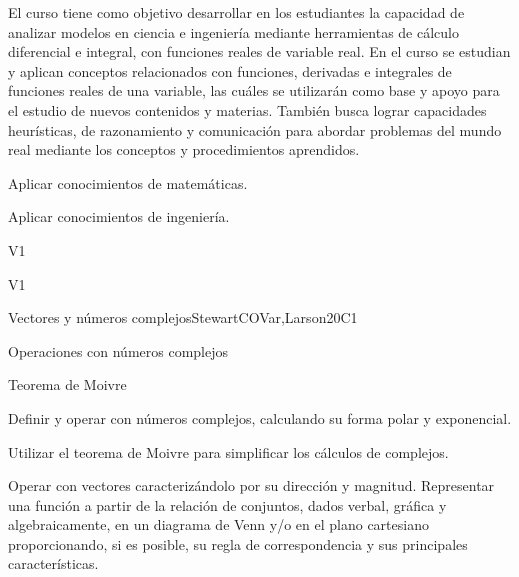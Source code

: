 \begin{syllabus}


\begin{justification}
El curso tiene como objetivo desarrollar en los estudiantes la capacidad de analizar modelos en ciencia e ingeniería mediante herramientas de cálculo
diferencial e integral, con funciones reales de variable real.
En el curso se estudian y aplican conceptos relacionados con funciones, derivadas e integrales de funciones reales de una variable, las cuáles se utilizarán como base y apoyo para el estudio de nuevos contenidos y materias.
También busca lograr capacidades heurísticas, de razonamiento y comunicación para abordar problemas del mundo real mediante los conceptos y procedimientos aprendidos.
\end{justification}

\begin{goals}
\item Aplicar conocimientos de matemáticas.
\item Aplicar conocimientos de ingeniería.
\end{goals}

\begin{outcomes}{V1}
   \item {}
   \item {}
\end{outcomes}

\begin{competences}{V1}
   \item {}
   \item {}
   \item {}
\end{competences}

\begin{unit}{Vectores y números complejos}{}{StewartCOVar,Larson}{20}{C1}
   \begin{topics}
      \item Operaciones con números complejos
      \item Teorema de Moivre
   \end{topics}

   \begin{learningoutcomes}
      \item Definir y operar con números complejos, calculando su forma polar y exponencial.
      \item Utilizar el teorema de Moivre para simplificar los cálculos de complejos.
      \item Operar con vectores caracterizándolo por su dirección y magnitud.  Representar una función a partir de la relación de conjuntos,  dados verbal, gráfica y algebraicamente,  en un diagrama de Venn  y/o en el plano cartesiano proporcionando, si es posible, su regla de correspondencia  y sus principales características.
   \end{learningoutcomes}
\end{unit}


\end{syllabus}
